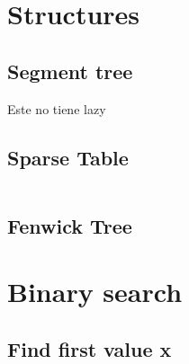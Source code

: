 \documentclass[twoside]{article}
\begin{document}
\begin{multicols*}{2}
	\section{}
	    
	\section{Structures}
	    \subsection{Segment tree}
	        Este no tiene lazy
    	\subsection{Sparse Table}
	    	\inputminted{cpp}{Estructuras/sparseTable.cpp}
    	\subsection{Fenwick Tree}
    
	\section{Binary search}
	    \subsection{Find first value x}
	        \inputminted{cpp}{BinarySearch/firstValueGEx.cpp}
\end{multicols*}
\end{document}
